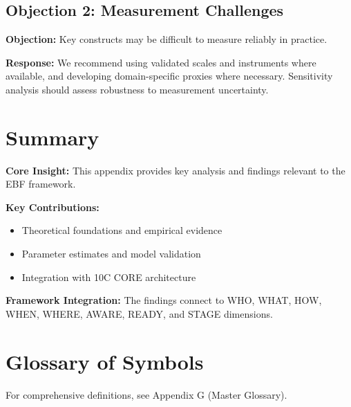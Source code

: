 \subsection{Objection 2: Measurement Challenges}

\textbf{Objection:} Key constructs may be difficult to measure reliably in
practice.

\textbf{Response:} We recommend using validated scales and instruments where
available, and developing domain-specific proxies where necessary. Sensitivity
analysis should assess robustness to measurement uncertainty.





\section{Summary}
\label{sec:llm-summary}

\begin{tcolorbox}[colback=gray!5!white, colframe=gray!75!black,
    title=Appendix LLM Summary]

\textbf{Core Insight:}
This appendix provides key analysis and findings relevant to the EBF framework.

\textbf{Key Contributions:}
\begin{itemize}[nosep]
    \item Theoretical foundations and empirical evidence
    \item Parameter estimates and model validation
    \item Integration with 10C CORE architecture
\end{itemize}

\textbf{Framework Integration:}
The findings connect to WHO, WHAT, HOW, WHEN, WHERE, AWARE, READY, and STAGE dimensions.

\end{tcolorbox}

\section{Glossary of Symbols}
\label{sec:llm-glossary}

For comprehensive definitions, see Appendix G (Master Glossary).

